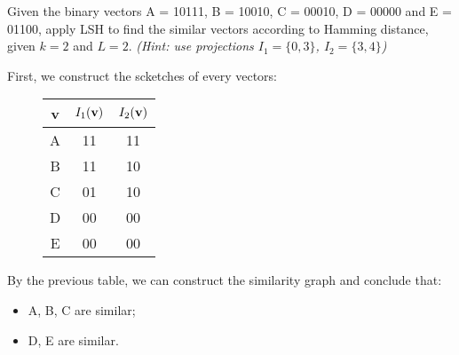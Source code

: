 \exercise

Given the binary vectors A = 10111, B = 10010, C = 00010, D = 00000 and E =
01100, apply LSH to find the similar vectors according to Hamming distance,
given $k = 2$ and $L = 2$. \emph{(Hint: use projections $I_1 = \{0, 3\}$, $I_2 =
\{3, 4\}$)}

\solution

First, we construct the scketches of every vectors:
%
\begin{figure}[H]
  \hfill
  \begin{minipage}{0.45\columnwidth}
  \centering
  \begin{tabular}{c|c|c}
    {\bf v} & $I_1(\text{\bf v})$ & $I_2(\text{\bf v})$ \\ \hline
    A & 11 & 11 \\
    B & 11 & 10 \\
    C & 01 & 10 \\
    D & 00 & 00 \\
    E & 00 & 00 \\
  \end{tabular}
  \end{minipage}
  \begin{minipage}{0.45\columnwidth}
  \end{minipage}
  \hfill
\end{figure}
%
By the previous table, we can construct the similarity graph and conclude that:
%
\begin{itemize}
  \item A, B, C are similar;
  \item D, E are similar.
\end{itemize}

